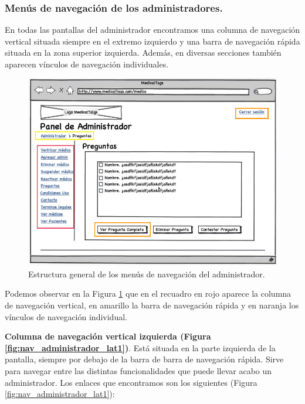 		\newpage
		\subsubsection{Menús de navegación de los administradores.} %
		\label{par:nav_menus_de_navegacion_de_los_administradores}
		
		En todas las pantallas del administrador encontramos una columna de navegación vertical situada siempre en el extremo izquierdo y una barra de navegación rápida situada en la zona superior izquierda. Además, en diversas secciones también aparecen vínculos de navegación individuales.
		
		\begin{figure}[H]
		  \centering
		    \includegraphics[width=15cm]{img/jpg/nav/administrador.jpg}
		  \caption{Estructura general de los menús de navegación del administrador.}
		  \label{fig:nav_administrador}
		\end{figure}
		
		Podemos observar en la Figura \ref{fig:nav_administrador} que en el recuadro en rojo aparece la columna de navegación vertical, en amarillo la barra de navegación rápida y en naranja los vínculos de navegación individual.
		
		\textbf{Columna de navegación vertical izquierda (Figura \ref{fig:nav_administrador_lat1})}. Está situada en la parte izquierda de la pantalla, siempre por debajo de la barra de  barra de navegación rápida. Sirve para navegar entre las distintas funcionalidades que puede llevar acabo un administrador. Los enlaces que encontramos son los siguientes (Figura \ref{fig:nav_administrador_lat1}):
		
